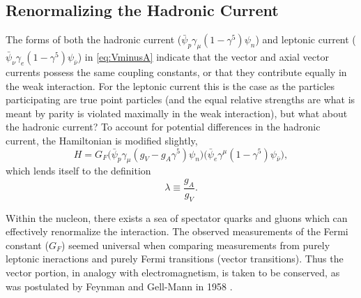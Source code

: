 
\subsection{Renormalizing the Hadronic Current}

The forms of both the hadronic current ($\bar{\psi}_p \gamma_\mu(1-\gamma^5)\psi_n$) and
leptonic current ($\bar{\psi}_\nu \gamma_e(1-\gamma^5)\psi_{\bar{\nu}}$) in \ref{eq:VminusA} indicate
that the vector and axial vector currents possess the same coupling constants, or that
they contribute equally in the weak interaction. For the leptonic current this is the case
as the particles participating are true point particles (and the equal relative strengths are
what is meant by parity is violated maximally in the weak interaction), but what about the
hadronic current? To account for potential differences in the hadronic current, the
Hamiltonian is modified slightly,
%
\begin{equation}
  H = G_F \Big(\bar{\psi}_p \gamma_\mu(g_V-g_A\gamma^5)\psi_n \Big)\Big(\bar{\psi}_{e} \gamma^\mu(1-\gamma^5)\psi_{\bar{\nu}} \Big),
  \label{eq:VminusA2}
\end{equation}
%
which lends itself to the definition
%
\begin{equation}
  \lambda \equiv \frac{g_A}{g_V}.
\end{equation}

Within the nucleon, there exists a sea of spectator quarks and gluons
which can effectively renormalize the interaction.
The observed measurements of the Fermi constant ($G_F$) seemed
universal when comparing measurements from
purely leptonic ineractions and purely Fermi transitions (vector transitions).
Thus the vector portion, in analogy with
electromagnetism, is taken to be conserved, as was postulated by Feynman and Gell-Mann in
1958 \cite{feynman1958}. 

